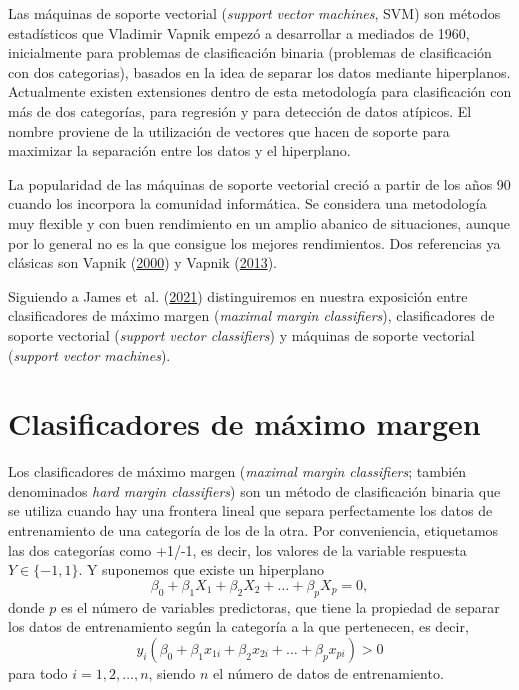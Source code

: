 \documentclass[
]{book}
\theoremstyle{break}
\theoremstyle{nonumberplain}
\begin{document}
Las máquinas de soporte vectorial (\emph{support vector machines}, SVM) son métodos estadísticos que Vladimir Vapnik empezó a desarrollar a mediados de 1960, inicialmente para problemas de clasificación binaria (problemas de clasificación con dos categorias), basados en la idea de separar los datos mediante hiperplanos.
Actualmente existen extensiones dentro de esta metodología para clasificación con más de dos categorías, para regresión y para detección de datos atípicos.
El nombre proviene de la utilización de vectores que hacen de soporte para maximizar la separación entre los datos y el hiperplano.

La popularidad de las máquinas de soporte vectorial creció a partir de los años 90 cuando los incorpora la comunidad informática.
Se considera una metodología muy flexible y con buen rendimiento en un amplio abanico de situaciones, aunque por lo general no es la que consigue los mejores rendimientos.
Dos referencias ya clásicas son Vapnik (\protect\hyperlink{ref-vapnik1998}{2000}) y Vapnik (\protect\hyperlink{ref-vapnik2013nature}{2013}).

Siguiendo a James et~al. (\protect\hyperlink{ref-james2021introduction}{2021}) distinguiremos en nuestra exposición entre clasificadores de máximo margen (\emph{maximal margin classifiers}), clasificadores de soporte vectorial (\emph{support vector classifiers}) y máquinas de soporte vectorial (\emph{support vector machines}).

\hypertarget{clasificadores-de-muxe1ximo-margen}{%
\section{Clasificadores de máximo margen}\label{clasificadores-de-muxe1ximo-margen}}

Los clasificadores de máximo margen (\emph{maximal margin classifiers}; también denominados \emph{hard margin classifiers}) son un método de clasificación binaria que se utiliza cuando hay una frontera lineal que separa perfectamente los datos de entrenamiento de una categoría de los de la otra.
Por conveniencia, etiquetamos las dos categorías como +1/-1, es decir, los valores de la variable respuesta \(Y \in \{-1, 1\}\).
Y suponemos que existe un hiperplano
\[ \beta_0 + \beta_1 X_1 + \beta_2 X_2 + \ldots + \beta_p X_p = 0,\]
donde \(p\) es el número de variables predictoras, que tiene la propiedad de separar los datos de entrenamiento según la categoría a la que pertenecen, es decir,
\[ y_i(\beta_0 + \beta_1 x_{1i} + \beta_2 x_{2i} + \ldots + \beta_p x_{pi}) > 0\]
para todo \(i = 1, 2, \ldots, n\), siendo \(n\) el número de datos de entrenamiento.
\end{document}

